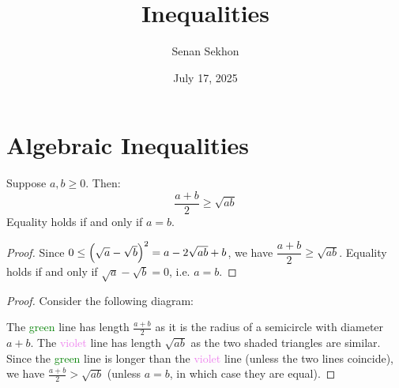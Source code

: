 \documentclass[main.tex]{subfiles}
\title{Inequalities}
\author{Senan Sekhon}
\date{July 17, 2025}
\begin{document}
\maketitle

\section{Algebraic Inequalities}

\begin{proposition}\label{am_gm_inequality_2_numbers}
    Suppose $a,b\ge 0$. Then:
    \begin{equation*}
        \frac{a+b}{2} \ge \sqrt{ab}
    \end{equation*}
    Equality holds if and only if $a=b$.
\end{proposition}
\begin{proof}
    Since $0\le\qty(\sqrt{a}-\sqrt{b})^2=a-2\sqrt{ab}+b$, we have $\dfrac{a+b}{2}\ge\sqrt{ab}$. Equality holds if and only if $\sqrt{a}-\sqrt{b}=0$, i.e. $a=b$.
\end{proof}
\begin{proof}
    Consider the following diagram:
    \begin{center}
    \end{center}
    \vspace{-5pt}
    The \textcolor{Green}{green} line has length $\frac{a+b}{2}$ as it is the radius of a semicircle with diameter $a+b$. The \textcolor{violet}{violet} line has length $\sqrt{ab}$ as the two shaded triangles are similar. Since the \textcolor{Green}{green} line is longer than the \textcolor{violet}{violet} line (unless the two lines coincide), we have $\frac{a+b}{2}>\sqrt{ab}$ (unless $a=b$, in which case they are equal).
\end{proof}
\end{document}
